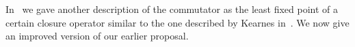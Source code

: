 \begin{comment}
  \begin{bmatrix} t(b,\bv) \\ t(b,\bv)  \end{bmatrix}}
{\begin{bmatrix} t(b,\bu) \\ t(b,\bu)  \end{bmatrix}
  \mathrel{\Delta_{\alpha, \beta}}
  \begin{bmatrix} t(a,\bu) \\ t(a,\bu)  \end{bmatrix}
  \mathrel{(\gamma \mytimes \gamma)}  %
  \begin{bmatrix} t(a,\bv) \\ t(a,\bv)  \end{bmatrix}
  \mathrel{\Delta_{\alpha, \beta}}
  \begin{bmatrix} t(b,\bv) \\ t(b,\bv)  \end{bmatrix}}
\]


Define
\begin{equation}
  \label{eq:6}
  \Phi_{\beta, \alpha}(\theta)
  = \{ (x,y) \in A^2 \mid
  (\exists\, (a,b) \in \theta)\,
\bigl(  (x,x) \mathrel{\Delta_{\beta, \alpha}} (a,a) \text{ and }
  (b,b) \mathrel{\Delta_{\beta, \alpha}} (y,y)\bigr)\}.
\end{equation}
It seems to me the statement ``$\gamma$ is
$\Delta_{\beta, \alpha}$-closed'' is equivalent to 
$\Phi_{\beta,\alpha}(\gamma)\subseteq \gamma$. However, it's not clear to me
that the commutator should
satisfy
$\Phi_{\beta,\alpha}\bigl([\alpha, \beta]\bigr) \subseteq [\alpha, \beta]$.


\end{comment}



In~\cite{com-fix-poi} we gave another description of the commutator
as the least fixed point of a certain closure operator similar 
to the one described by Kearnes
in~\cite[p.~930]{MR1358491}.
We now give an improved version of our earlier proposal.

